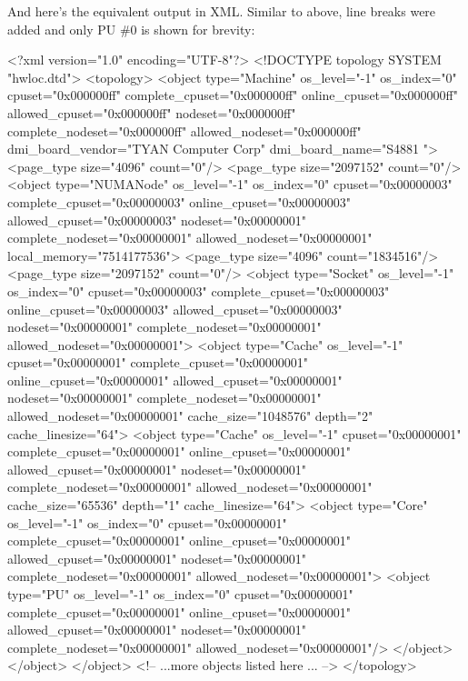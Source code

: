 And here's the equivalent output in XML. Similar to above, line breaks were added and only PU \#0 is shown for brevity:

\begin{DoxyVerb}
<?xml version="1.0" encoding="UTF-8"?>
<!DOCTYPE topology SYSTEM "hwloc.dtd">
<topology>
  <object type="Machine" os_level="-1" os_index="0" cpuset="0x000000ff" 
      complete_cpuset="0x000000ff" online_cpuset="0x000000ff" 
      allowed_cpuset="0x000000ff" nodeset="0x000000ff" 
      complete_nodeset="0x000000ff" allowed_nodeset="0x000000ff" 
      dmi_board_vendor="TYAN Computer Corp" dmi_board_name="S4881 ">
    <page_type size="4096" count="0"/>
    <page_type size="2097152" count="0"/>
    <object type="NUMANode" os_level="-1" os_index="0" cpuset="0x00000003" 
        complete_cpuset="0x00000003" online_cpuset="0x00000003" 
        allowed_cpuset="0x00000003" nodeset="0x00000001" 
        complete_nodeset="0x00000001" allowed_nodeset="0x00000001" 
        local_memory="7514177536">
      <page_type size="4096" count="1834516"/>
      <page_type size="2097152" count="0"/>
      <object type="Socket" os_level="-1" os_index="0" cpuset="0x00000003" 
          complete_cpuset="0x00000003" online_cpuset="0x00000003" 
          allowed_cpuset="0x00000003" nodeset="0x00000001" 
          complete_nodeset="0x00000001" allowed_nodeset="0x00000001">
        <object type="Cache" os_level="-1" cpuset="0x00000001" 
            complete_cpuset="0x00000001" online_cpuset="0x00000001" 
            allowed_cpuset="0x00000001" nodeset="0x00000001" 
            complete_nodeset="0x00000001" allowed_nodeset="0x00000001" 
            cache_size="1048576" depth="2" cache_linesize="64">
          <object type="Cache" os_level="-1" cpuset="0x00000001" 
              complete_cpuset="0x00000001" online_cpuset="0x00000001" 
              allowed_cpuset="0x00000001" nodeset="0x00000001" 
              complete_nodeset="0x00000001" allowed_nodeset="0x00000001" 
              cache_size="65536" depth="1" cache_linesize="64">
            <object type="Core" os_level="-1" os_index="0" 
                cpuset="0x00000001" complete_cpuset="0x00000001" 
                online_cpuset="0x00000001" allowed_cpuset="0x00000001" 
                nodeset="0x00000001" complete_nodeset="0x00000001" 
                allowed_nodeset="0x00000001">
              <object type="PU" os_level="-1" os_index="0" cpuset="0x00000001" 
                  complete_cpuset="0x00000001" online_cpuset="0x00000001" 
                  allowed_cpuset="0x00000001" nodeset="0x00000001" 
                  complete_nodeset="0x00000001" allowed_nodeset="0x00000001"/>
            </object>
          </object>
        </object>
  <!-- ...more objects listed here ... -->
</topology>
\end{DoxyVerb}


